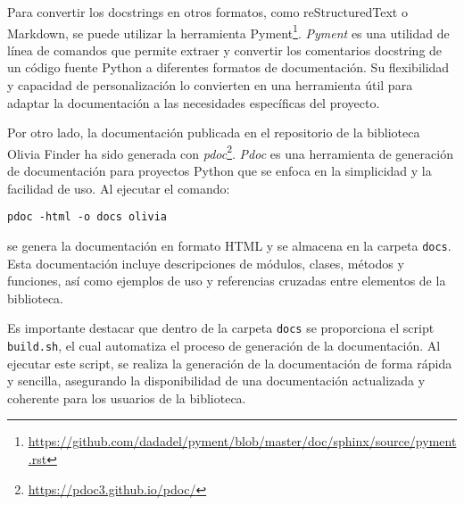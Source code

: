 Para convertir los docstrings en otros formatos, como reStructuredText o Markdown, se puede utilizar la 
herramienta Pyment\footnote{\url{https://github.com/dadadel/pyment/blob/master/doc/sphinx/source/pyment.rst}}. \textit{Pyment} es una utilidad de línea de comandos 
que permite extraer y convertir los comentarios docstring de un código fuente Python a diferentes formatos 
de documentación. Su flexibilidad y capacidad de personalización lo convierten en una herramienta útil 
para adaptar la documentación a las necesidades específicas del proyecto.

Por otro lado, la documentación publicada en el repositorio de la biblioteca Olivia Finder ha sido generada 
con \textit{pdoc}\footnote{\url{https://pdoc3.github.io/pdoc/}}. \textit{Pdoc} es una herramienta de generación de documentación 
para proyectos Python que se enfoca en la simplicidad y la facilidad de uso. Al ejecutar el comando:

\begin{center}
    \texttt{pdoc -html -o docs olivia}
\end{center}

se genera la documentación en formato HTML y se almacena en la 
carpeta \texttt{docs}. Esta documentación incluye descripciones de módulos, clases, métodos y funciones,
 así como ejemplos de uso y referencias cruzadas entre elementos de la biblioteca.

Es importante destacar que dentro de la carpeta \texttt{docs} se proporciona el script \texttt{build.sh}, 
el cual automatiza el proceso de generación de la documentación. Al ejecutar este script, se realiza la 
generación de la documentación de forma rápida y sencilla, asegurando la disponibilidad de una documentación 
actualizada y coherente para los usuarios de la biblioteca.